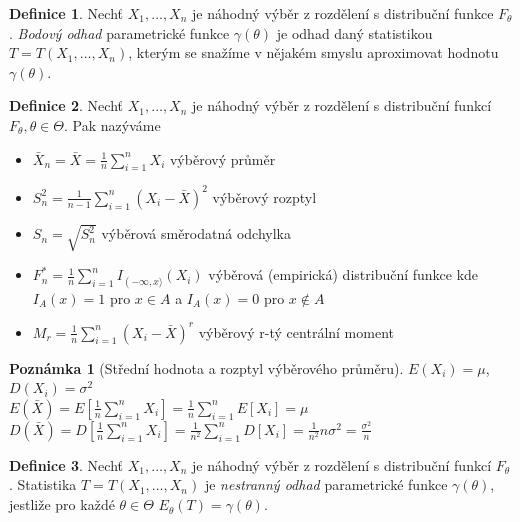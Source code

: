 \documentclass[a4]{report}
\theoremstyle{definition}
\newtheorem{definition}{Definice}[section]
\newtheorem{notes}{Poznámka}[section]
\begin{document}
{\begin{definition}
Nechť $X_1,\ldots,X_n$ je náhodný výběr z rozdělení s distribuční funkce $F_{\theta}$. \textit{Bodový odhad} parametrické funkce $\gamma \left(\theta \right)$ je odhad daný statistikou $T=T \left(X_1,\ldots,X_n \right)$, kterým se snažíme v nějakém smyslu aproximovat hodnotu $\gamma \left(\theta \right)$.
\end{definition}

\begin{definition}
Nechť $X_1,\ldots,X_n$ je náhodný výběr z rozdělení s distribuční funkcí $F_{\theta}, \theta \in \Theta$. Pak nazýváme \begin{itemize}
\item $\bar{X}_n = \bar{X} = \frac{1}{n} \sum_{i=1}^{n} X_i$ výběrový průměr
\item $S_{n}^{2} = \frac{1}{n-1}\sum_{i=1}^{n} \left( X_i - \bar{X}\right)^2$ výběrový rozptyl 
\item $S_{n} = \sqrt{S_{n}^{2}}$ výběrová směrodatná odchylka
\item $F_{n}^{*} = \frac{1}{n} \sum_{i=1}^{n} I_{\left( - \infty , x \rangle \right.} \left(X_i \right)$ výběrová (empirická) distribuční funkce kde $I_A \left( x \right) = 1$ pro $x \in A$ a $I_A \left( x \right) = 0$ pro $x \notin A$
\item $M_r = \frac{1}{n} \sum_{i=1}^{n} \left( X_i - \bar{X}\right)^r$ výběrový r-tý centrální moment
\end{itemize}
\end{definition}

\begin{notes}[Střední hodnota a rozptyl výběrového průměru]
$E \left(X_i \right) = \mu$, $D \left(X_i \right) = \sigma^2 $\\
$E \left(\bar{X} \right) = E \left[\frac{1}{n} \sum_{i=1}^{n} X_i \right] = \frac{1}{n} \sum_{i=1}^{n} E\left[ X_i \right] = \mu$\\
$D \left(\bar{X} \right) = D \left[\frac{1}{n} \sum_{i=1}^{n} X_i \right] = \frac{1}{n^2} \sum_{i=1}^{n} D\left[ X_i \right] = \frac{1}{n^2} n \sigma^2 = \frac{\sigma^2}{n}$
\end{notes}

\begin{definition}
Nechť $X_1,\ldots,X_n$ je náhodný výběr z rozdělení s distribuční funkcí $F_{\theta}$. Statistika $T=T \left(X_1,\ldots,X_n \right)$ je \textit{nestranný odhad} parametrické funkce $\gamma \left(\theta \right)$, jestliže pro každé $\theta \in \Theta$ $E_{\theta} \left(T \right) = \gamma \left(\theta \right)$.
\end{definition}

}
\end{document}
